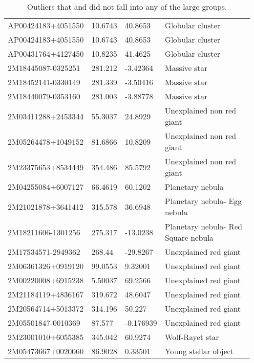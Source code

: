 \documentclass[fleqn,usenatbib]{mnras}
\begin{document}
\begin{table*}
\begin{tabular}{llll}
  AP00424183+4051550 &  10.6743 &   40.8653 &                     Globular cluster \\
  AP00424183+4051550 &  10.6743 &   40.8653 &                     Globular cluster \\
  AP00431764+4127450 &  10.8235 &   41.4625 &                     Globular cluster \\
  2M18445087-0325251 &  281.212 &  -3.42364 &                         Massive star \\
  2M18452141-0330149 &  281.339 &  -3.50416 &                         Massive star \\
  2M18440079-0353160 &  281.003 &  -3.88778 &                         Massive star \\
  2M03411288+2453344 &  55.3037 &   24.8929 &                                   Unexplained non red giant \\
  2M05264478+1049152 &  81.6866 &   10.8209 &                                   Unexplained non red giant \\
  2M23375653+8534449 &  354.486 &   85.5792 &                                   Unexplained non red giant \\
  2M04255084+6007127 &  66.4619 &   60.1202 &                     Planetary nebula \\
  2M21021878+3641412 &  315.578 &   36.6948 &         Planetary nebula- Egg nebula \\
  2M18211606-1301256 &  275.317 &  -13.0238 &  Planetary nebula- Red Square nebula \\
  2M17534571-2949362 &   268.44 &  -29.8267 &                   Unexplained red giant \\
  2M06361326+0919120 &  99.0553 &   9.32001 &                  Unexplained red giant \\
  2M00220008+6915238 &  5.50037 &   69.2566 &                   Unexplained red giant \\
  2M21184119+4836167 &  319.672 &   48.6047 &                   Unexplained red giant \\
  2M20564714+5013372 &  314.196 &    50.227 &                   Unexplained red giant \\
  2M05501847-0010369 &   87.577 & -0.176939 &                   Unexplained red giant \\
  2M23001010+6055385 &  345.042 &   60.9274 &                      Wolf-Rayet star \\
  2M05473667+0020060 &  86.9028 &   0.33501 &                 Young stellar object \\
  \bottomrule
  \end{tabular}
  \caption{Outliers that and did not fall into any of the large groups.}
	\label{tab:outliers_table}
\end{table*}
\end{document}
